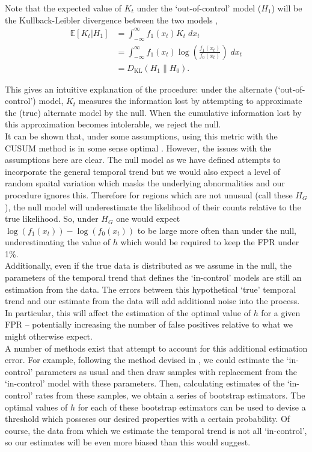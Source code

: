 \documentclass[11pt]{report}
\begin{document}
Note that the expected value of $K_t$ under the `out-of-control' model ($H_1$) will be the Kullback-Leibler divergence between the two models \citep{weighed},
\begin{align*}
\mathbb{E}[K_t | H_1] &= \int_{-\infty}^{\infty} f_1(x_t) K_t \; dx_t \\
                        &= \int_{-\infty}^{\infty} f_1(x_t) \log{\left(\frac{f_1(x_t)}{f_0(x_t)}\right)} \; dx_t \\
                        &= D_{\mathrm{KL}}(H_1\|H_0).
\end{align*}

This gives an intuitive explanation of the procedure: under the alternate (`out-of-control') model, $K_t$ measures the information lost by attempting to approximate the (true) alternate model by the null. When the cumulative information lost by this approximation becomes intolerable, we reject the null. \\

It can be shown that, under some assumptions, using this metric with the CUSUM method is in some sense optimal \citep{ritov1990}. However, the issues with the assumptions here are clear. The null model as we have defined attempts to incorporate the general temporal trend but we would also expect a level of random spaital variation which masks the underlying abnormalities and our procedure ignores this. Therefore for regions which are not unusual (call these $H_G$), the null model will underestimate the likelihood of their counts relative to the true likelihood. So, under $H_G$ one would expect $\log(f_1(x_t)) - \log(f_0(x_t))$ to be large more often than under the null, underestimating the value of $h$ which would be required to keep the FPR under 1\%. \\

Additionally, even if the true data is distributed as we assume in the null, the parameters of the temporal trend that defines the `in-control' models are still an estimation from the data. The errors between this hypothetical `true' temporal trend and our estimate from the data will add additional noise into the process. In particular, this will affect the estimation of the optimal value of $h$ for a given FPR -- potentially increasing the number of false positives relative to what we might otherwise expect. \\

A number of methods exist that attempt to account for this additional estimation error. For example, following the method devised in \citet{gandy}, we could estimate the `in-control' parameters as usual and then draw samples with replacement from the `in-control' model with these parameters. Then, calculating estimates of the `in-control' rates from these samples, we obtain a series of bootstrap estimators. The optimal values of $h$ for each of these bootstrap estimators can be used to devise a threshold which posseses our desired properties with a certain probability. Of course, the data from which we estimate the temporal trend is not all `in-control', so our estimates will be even more biased than this would suggest. 
 
\end{document}
